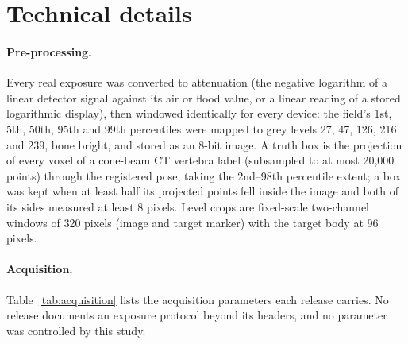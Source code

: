 
\section*{Technical details}

\paragraph{Pre-processing.}
Every real exposure was converted to attenuation (the negative logarithm of a linear detector signal against its
air or flood value, or a linear reading of a stored logarithmic display), then windowed identically for every
device: the field's 1st, 5th, 50th, 95th and 99th percentiles were mapped to grey levels 27, 47, 126, 216 and 239,
bone bright, and stored as an 8-bit image. A truth box is the projection of every voxel of a cone-beam CT vertebra
label (subsampled to at most 20,000 points) through the registered pose, taking the 2nd--98th percentile extent;
a box was kept when at least half its projected points fell inside the image and both of its sides measured at
least 8 pixels. Level crops are fixed-scale two-channel windows of 320 pixels (image and target marker) with the
target body at 96 pixels.

\paragraph{Acquisition.}
Table~\ref{tab:acquisition} lists the acquisition parameters each release carries. No release documents an exposure protocol beyond
its headers, and no parameter was controlled by this study.

